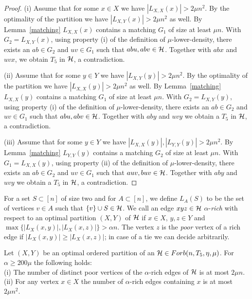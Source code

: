 \documentclass[11pt]{article}
\begin{document}
\begin{proof}
(i) Assume that for some $x\in X$ we have $|L_{X,X}(x)|> 2\mu n^2.$
By the optimality of the partition we have $|L_{X,Y}(x)|> 2\mu n^2$
as well. By Lemma~\ref{matching} $L_{X,X}(x)$ contains a matching
$G_1$ of size at least $\mu n$. With $G_2=L_{X,Y}(x)$, using
property (i) of the definition of $\mu$-lower-density, there exists
an $ab\in G_2$ and $uv\in G_1$ such that $abu,abv\in \mathcal{H}$. Together
with $abx$ and $uvx$, we obtain   $T_5$ in $\mathcal{H}$, a contradiction.

 (ii) Assume that for
some $y\in Y$ we have  $|L_{X,Y}(y)|> 2\mu n^2.$ By the optimality
of the partition we have $|L_{X,X}(y)|> 2\mu n^2$ as well. By
Lemma~\ref{matching} $L_{X,X}(y)$ contains a matching $G_1$ of size
at least $\mu n$. With $G_2=L_{X,Y}(y)$, using property (i) of the
definition of $\mu$-lower-density, there exists an $ab\in G_2$ and
$uv\in G_1$ such that $abu,abv\in \mathcal{H}$. Together with $aby$ and
$uvy$ we obtain a $T_5$ in $\mathcal{H}$, a contradiction.

 (iii) Assume that for some $y\in Y$ we have
$|L_{X,X}(y)|,|L_{Y,Y}(y)|> 2\mu n^2.$ By Lemma~\ref{matching}
$L_{Y,Y}(y)$ contains a matching $G_2$ of size at least $\mu n$.
With $G_1=L_{X,X}(y)$, using property (ii) of the definition of
$\mu$-lower-density, there exists an $ab\in G_2$ and $uv\in G_1$
such that $auv,buv\in \mathcal{H}$. Together with $aby$ and $uvy$  we obtain
a $T_5$ in $\mathcal{H}$, a contradiction.
\end{proof}


For a set $S\subset [n]$ of size  two and for $A\subset [n]$, we
define $L_A(S)$ to be the set of vertices $v\in A$ such that $\{v\}\cup
S\in \mathcal{H}$.
 We call an edge $xyz\in \mathcal{H}$ $\alpha$-{\it rich} with respect to
an optimal partition $(X,Y)$ of $\mathcal{H}$ if $x\in X$, $y,z\in Y$ and
$\max\{|L_{X}(x,y)|, |L_X(x,z)|\}> \alpha n$. The vertex $z$ is the
{\it poor} vertex of a rich edge if $|L_{X}(x,y)|\ge  |L_X(x,z)|$;
in case of a tie we can decide arbitrarily.

\begin{lemma}\label{richedges}
Let  $(X,Y)$ be an optimal ordered partition  of an $\mathcal{H}\in Forb(n,T_5,\eta,\mu)$.
For  $\alpha\ge 200\mu$  the following holds:\\
(i) The number of distinct poor vertices of the $\alpha$-rich edges of $\mathcal{H}$ is at most $2\mu n$.\\
(ii) For any vertex $x\in X$ the number of $\alpha$-rich edges
containing $x$ is at most $2\mu n^2$.
\end{lemma}
\end{document}
